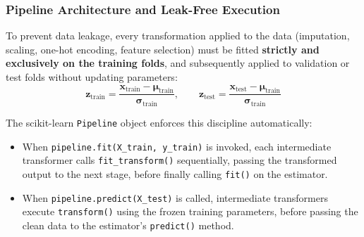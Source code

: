 \subsubsection{Pipeline Architecture and Leak-Free Execution}

To prevent data leakage, every transformation applied to the data (imputation, scaling, one-hot encoding, feature selection) must be fitted \textbf{strictly and exclusively on the training folds}, and subsequently applied to validation or test folds without updating parameters:
\begin{equation}
\mathbf{z}_{\text{train}} = \frac{\mathbf{x}_{\text{train}} - \boldsymbol{\mu}_{\text{train}}}{\boldsymbol{\sigma}_{\text{train}}}, \qquad \mathbf{z}_{\text{test}} = \frac{\mathbf{x}_{\text{test}} - \boldsymbol{\mu}_{\text{train}}}{\boldsymbol{\sigma}_{\text{train}}}\label{eq:leak_free_scaling}
\end{equation}

The scikit-learn \texttt{Pipeline} object enforces this discipline automatically:
\begin{itemize}
    \item When \texttt{pipeline.fit(X\_train, y\_train)} is invoked, each intermediate transformer calls \texttt{fit\_transform()} sequentially, passing the transformed output to the next stage, before finally calling \texttt{fit()} on the estimator.
    \item When \texttt{pipeline.predict(X\_test)} is called, intermediate transformers execute \texttt{transform()} using the frozen training parameters, before passing the clean data to the estimator's \texttt{predict()} method.
\end{itemize}

